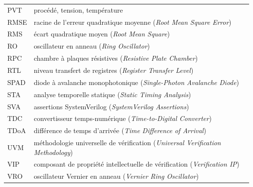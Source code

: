 \begin{tabularx}{\textwidth}{lX}
PVT & procédé, tension, température \\
RMSE & racine de l'erreur quadratique moyenne (\textit{Root Mean Square Error}) \\
RMS & écart quadratique moyen (\textit{Root Mean Square}) \\
RO & oscillateur en anneau (\textit{Ring Oscillator}) \\
RPC & chambre à plaques résistives (\textit{Resistive Plate Chamber}) \\
RTL & niveau transfert de registres (\textit{Register Transfer Level}) \\
SPAD & diode à avalanche monophotonique (\textit{Single-Photon Avalanche Diode}) \\
STA & analyse temporelle statique (\textit{Static Timing Analysis}) \\
SVA & assertions SystemVerilog (\textit{SystemVerilog Assertions}) \\
TDC & convertisseur temps-numérique (\textit{Time-to-Digital Converter}) \\
TDoA & différence de temps d'arrivée (\textit{Time Difference of Arrival}) \\
UVM & méthodologie universelle de vérification (\textit{Universal Verification Methodology}) \\
VIP & composant de propriété intellectuelle de vérification (\textit{Verification IP}) \\
VRO & oscillateur Vernier en anneau (\textit{Vernier Ring Oscillator}) \\
\end{tabularx}
